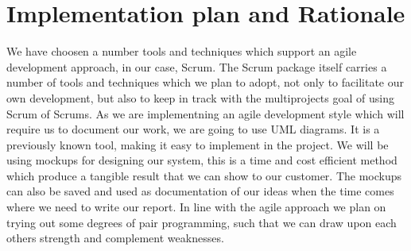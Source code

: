 \section*{Implementation plan and Rationale}
We have choosen a number tools and techniques which support an agile development approach, in our case, Scrum.
The Scrum package itself carries a number of tools and techniques which we plan to adopt, not only to facilitate our own development, but also to keep in track 
with the multiprojects goal of using Scrum of Scrums.
As we are implementning an agile development style which will require us to document our work, we are going to use UML diagrams. It is a previously known tool, making it easy to
implement in the project. We will be using mockups for designing our system, this is a time and cost efficient method which produce a tangible result that we can show to our customer.
The mockups can also be saved and used as documentation of our ideas when the time comes where we need to write our report.
In line with the agile approach we plan on trying out some degrees of pair programming, such that we can draw upon each others strength and complement weaknesses.




